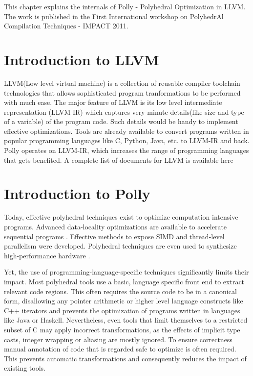 \label{chap:polly}

This chapter explains the internals of  Polly - Polyhedral Optimization
in LLVM\cite{llvm}. The work is published in the First International workshop on PolyhedrAl Compilation
Techniques - IMPACT 2011\cite{pollypaper}.

\section{Introduction to LLVM}

LLVM(Low level virtual machine) is a collection of reusable compiler toolchain technologies that 
allows sophisticated program tranformations to be performed with much ease. The
major feature of LLVM is its low level intermediate representation
(LLVM-IR) 
which captures very minute details(like size and type of a variable) of the program code.
Such details would be handy to implement effective optimizations. Tools
are already available to convert programs written in popular programming
languages like C, Python, Java, etc. to LLVM-IR and back. Polly operates
on LLVM-IR, which increases the range of programming languages that gets
benefited. A complete list of documents for LLVM is available here\cite{llvmdocs}

\section{Introduction to Polly}

Today, effective polyhedral techniques exist to optimize computation intensive
programs.  Advanced data-locality optimizations are available to accelerate
sequential programs \cite{uday08pldi}. Effective methods to expose SIMD and
thread-level parallelism were developed.  Polyhedral
techniques are even used to synthesize high-performance hardware
\cite{RISSET:2008}.

Yet, the use of programming-language-specific techniques significantly limits
their impact.  Most polyhedral tools use a basic, language specific front end
to extract relevant code regions. This often requires the source code to be in
a canonical form, disallowing any pointer arithmetic or higher level
language constructs like C++ iterators and prevents the optimization of
programs written in languages like Java or Haskell. Nevertheless, even tools
that limit themselves to a restricted subset of C may apply incorrect
transformations, as the effects of implicit type casts, integer wrapping or
aliasing are mostly ignored. To ensure correctness manual annotation
of code that is regarded safe to optimize is often required.  This prevents
automatic transformations and consequently reduces the impact of existing
tools.

